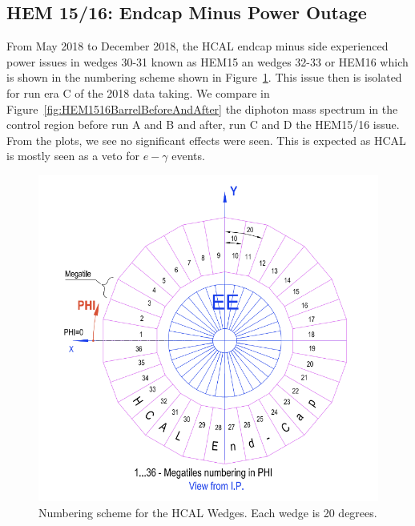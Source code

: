 \subsection{HEM 15/16: Endcap Minus Power Outage}

From May 2018 to December 2018, the HCAL endcap minus side experienced power issues in wedges 30-31 known as HEM15 an wedges 32-33 or HEM16 which is shown in the numbering scheme shown in Figure~\ref{fig:HCALwedges}. This issue then is isolated for run era C of the 2018 data taking. We compare in Figure~\ref{fig:HEM1516BarrelBeforeAndAfter} the diphoton mass spectrum in the control region before run A and B and after, run C and D the HEM15/16 issue. From the plots, we see no significant effects were seen. This is expected as HCAL is mostly seen as a veto for $e-\gamma$ events. 

\begin{figure}[!htb]
	\centering
	\includegraphics[scale=0.65]{fig/NumberingSchemeHCALWedges.png}
	\caption{Numbering scheme for the HCAL Wedges. Each wedge is 20 degrees.}
	\label{fig:HCALwedges}
\end{figure}


